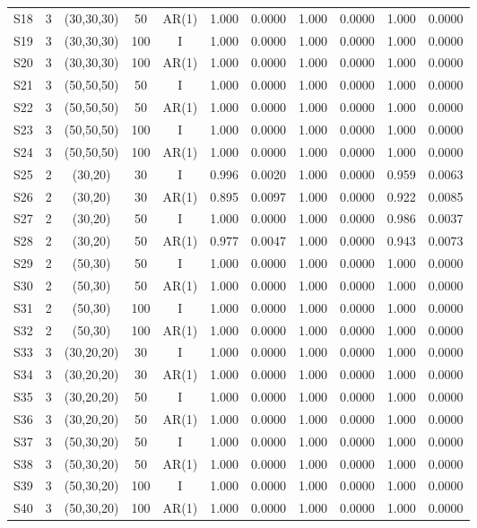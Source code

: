 \begin{table}[ht]
\begin{tabular}{ccccccccccc}
S18 & 3 & (30,30,30) & 50 & AR(1) & 1.000 & 0.0000 & 1.000 & 0.0000 & 1.000 & 0.0000 \\
S19 & 3 & (30,30,30) & 100 & I & 1.000 & 0.0000 & 1.000 & 0.0000 & 1.000 & 0.0000 \\
S20 & 3 & (30,30,30) & 100 & AR(1) & 1.000 & 0.0000 & 1.000 & 0.0000 & 1.000 & 0.0000 \\
S21 & 3 & (50,50,50) & 50 & I & 1.000 & 0.0000 & 1.000 & 0.0000 & 1.000 & 0.0000 \\
S22 & 3 & (50,50,50) & 50 & AR(1) & 1.000 & 0.0000 & 1.000 & 0.0000 & 1.000 & 0.0000 \\
S23 & 3 & (50,50,50) & 100 & I & 1.000 & 0.0000 & 1.000 & 0.0000 & 1.000 & 0.0000 \\
S24 & 3 & (50,50,50) & 100 & AR(1) & 1.000 & 0.0000 & 1.000 & 0.0000 & 1.000 & 0.0000 \\
S25 & 2 & (30,20) & 30 & I & 0.996 & 0.0020 & 1.000 & 0.0000 & 0.959 & 0.0063 \\
S26 & 2 & (30,20) & 30 & AR(1) & 0.895 & 0.0097 & 1.000 & 0.0000 & 0.922 & 0.0085 \\
S27 & 2 & (30,20) & 50 & I & 1.000 & 0.0000 & 1.000 & 0.0000 & 0.986 & 0.0037 \\
S28 & 2 & (30,20) & 50 & AR(1) & 0.977 & 0.0047 & 1.000 & 0.0000 & 0.943 & 0.0073 \\
S29 & 2 & (50,30) & 50 & I & 1.000 & 0.0000 & 1.000 & 0.0000 & 1.000 & 0.0000 \\
S30 & 2 & (50,30) & 50 & AR(1) & 1.000 & 0.0000 & 1.000 & 0.0000 & 1.000 & 0.0000 \\
S31 & 2 & (50,30) & 100 & I & 1.000 & 0.0000 & 1.000 & 0.0000 & 1.000 & 0.0000 \\
S32 & 2 & (50,30) & 100 & AR(1) & 1.000 & 0.0000 & 1.000 & 0.0000 & 1.000 & 0.0000 \\
S33 & 3 & (30,20,20) & 30 & I & 1.000 & 0.0000 & 1.000 & 0.0000 & 1.000 & 0.0000 \\
S34 & 3 & (30,20,20) & 30 & AR(1) & 1.000 & 0.0000 & 1.000 & 0.0000 & 1.000 & 0.0000 \\
S35 & 3 & (30,20,20) & 50 & I & 1.000 & 0.0000 & 1.000 & 0.0000 & 1.000 & 0.0000 \\
S36 & 3 & (30,20,20) & 50 & AR(1) & 1.000 & 0.0000 & 1.000 & 0.0000 & 1.000 & 0.0000 \\
S37 & 3 & (50,30,20) & 50 & I & 1.000 & 0.0000 & 1.000 & 0.0000 & 1.000 & 0.0000 \\
S38 & 3 & (50,30,20) & 50 & AR(1) & 1.000 & 0.0000 & 1.000 & 0.0000 & 1.000 & 0.0000 \\
S39 & 3 & (50,30,20) & 100 & I & 1.000 & 0.0000 & 1.000 & 0.0000 & 1.000 & 0.0000 \\
S40 & 3 & (50,30,20) & 100 & AR(1) & 1.000 & 0.0000 & 1.000 & 0.0000 & 1.000 & 0.0000 \\
\hline
\end{tabular}
\end{table}
